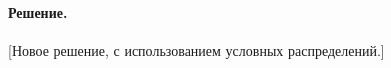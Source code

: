 \documentclass[specialist,
substylefile = spbu_report.rtx,
subf,href,colorlinks=true, 12pt]{disser}
\newenvironment{solution}{\paragraph{Решение.}}{\hfill}
\begin{document}
\begin{solution}[Новое решение, с использованием условных распределений.]
	\end{solution}
\end{document}
